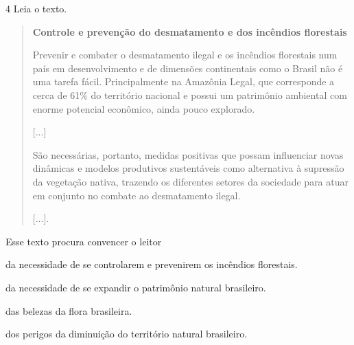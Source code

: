 
\num{4} Leia o texto.

\begin{quote}
\textbf{Controle e prevenção do desmatamento e dos incêndios florestais}

Prevenir e combater o desmatamento ilegal e os incêndios florestais num
país em desenvolvimento e de dimensões continentais como o Brasil não é
uma tarefa fácil. Principalmente na Amazônia Legal, que corresponde a
cerca de 61\% do território nacional e possui um patrimônio ambiental
com enorme potencial econômico, ainda pouco explorado.

{[}...{]}

São necessárias, portanto, medidas positivas que possam influenciar
novas dinâmicas e modelos produtivos sustentáveis como alternativa à
supressão da vegetação nativa, trazendo os diferentes setores da
sociedade para atuar em conjunto no combate ao desmatamento ilegal.

{[}...{]}.

\end{quote}

Esse texto procura convencer o leitor

\begin{escolha}
\item da necessidade de se controlarem e prevenirem os incêndios florestais.

\item da necessidade de se expandir o patrimônio natural brasileiro.

\item das belezas da flora brasileira.

\item dos perigos da diminuição do território natural brasileiro.
\end{escolha}

